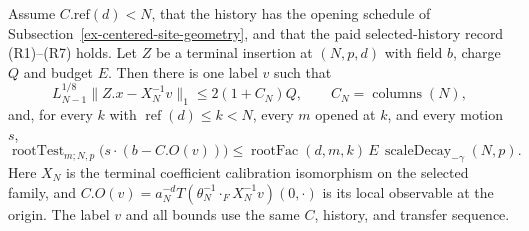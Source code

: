 \begin{proposition}
\label{prop:actual-marked-figment}
Assume $C.\mathrm{ref}(d)<N$, that the history has the opening schedule
of Subsection~\ref{ex-centered-site-geometry}, and that the paid
selected-history record (R1)--(R7) holds. Let $Z$ be a terminal insertion at
$(N,p,d)$ with field $b$, charge $Q$ and budget $E$. Then there is one
label $v$ such that
\[
 L_{N-1}^{1/8}
       \|Z.x-X_N^{-1}v\|_1
       \leq 2(1+C_N)Q,
 \qquad C_N=\operatorname{columns}(N),
\]
and, for every $k$ with $\operatorname{ref}(d)\leq k<N$, every $m$
opened at $k$, and every motion $s$,
\[
 \operatorname{rootTest}_{m;N,p}\bigl(s\cdot(b-C.O(v))\bigr)
       \leq \operatorname{rootFac}(d,m,k)\,E\,
               \operatorname{scaleDecay}_{-\gamma}(N,p).
\]
Here $X_N$ is the
terminal coefficient calibration isomorphism on the selected family, and
$C.O(v)=a_N^{-d}T(\theta_N^{-1}\mathbin{\cdot_F}
X_N^{-1}v)(0,\cdot)$ is its local observable at the origin.
The label $v$ and all bounds use the same $C$, history, and transfer sequence.
\end{proposition}
